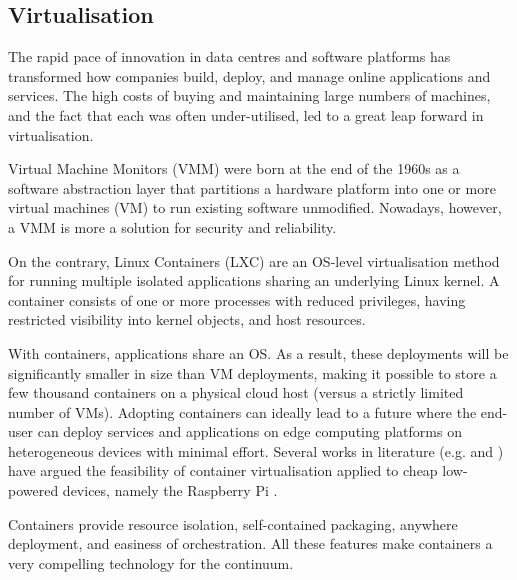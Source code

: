 \subsection{Virtualisation}
\label{sec:virtualisation}

The rapid pace of innovation in data centres and software platforms has transformed how companies build, deploy, and manage online applications and services. The high costs of buying and maintaining large numbers of machines, and the fact that each was often under-utilised, led to a great leap forward in virtualisation.

Virtual Machine Monitors (VMM) \cite{rosenblum2005virtual} were born at the end of the 1960s as a software abstraction layer that partitions a hardware platform into one or more virtual machines (VM) to run existing software unmodified. Nowadays, however, a VMM is more a solution for security and reliability.


On the contrary, Linux Containers (LXC) \cite{bernstein2014containers} are an OS-level virtualisation method for running multiple isolated applications sharing an underlying Linux kernel. A container consists of one or more processes with reduced privileges, having restricted visibility into kernel objects, and host resources.

With containers, applications share an OS. As a result, these deployments will be significantly smaller in size than VM deployments, making it possible to store a few thousand containers on a physical cloud host (versus a strictly limited number of VMs). Adopting containers can ideally lead to a future where the end-user can deploy services and applications on edge computing platforms on heterogeneous devices with minimal effort. Several works in literature (e.g. \cite{pahl2016container} and \cite{bellavista2017feasibility}) have argued the feasibility of container virtualisation applied to cheap low-powered devices, namely the Raspberry Pi \cite{raspberry}.

Containers provide resource isolation, self-contained packaging, anywhere deployment, and easiness of orchestration. All these features make containers a very compelling technology for the continuum.


